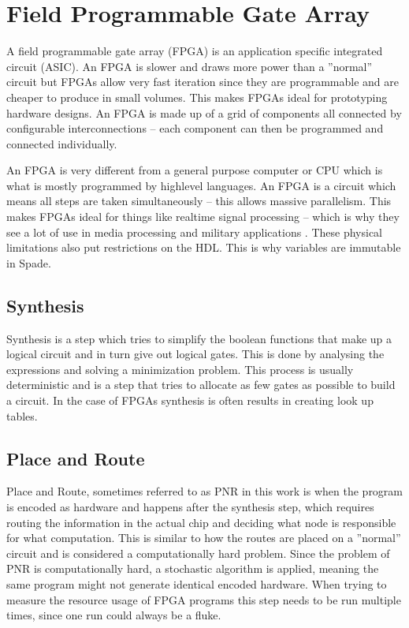 \section{Field Programmable Gate Array}
A field programmable gate array (FPGA) is an application specific integrated circuit (ASIC). An FPGA is slower and draws more power than a ''normal'' circuit but FPGAs allow very fast iteration since they are programmable and are cheaper to produce in small volumes. This makes FPGAs ideal for prototyping hardware designs. An FPGA is made up of a grid of components all connected by configurable interconnections -- each component can then be programmed and connected individually. \cite{src:FPGA}

An FPGA is very different from a general purpose computer or CPU which is what is mostly programmed by highlevel languages. An FPGA is a circuit which means all steps are taken simultaneously -- this allows massive parallelism. This makes FPGAs ideal for things like realtime signal processing -- which is why they see a lot of use in media processing and military applications \cite{src:FPGAApplications}. These physical limitations also put restrictions on the HDL. This is why variables are immutable in Spade.

\subsection{Synthesis}
Synthesis is a step which tries to simplify the boolean functions that make up a logical circuit and in turn give out logical gates. This is done by analysing the expressions and solving a minimization problem. This process is usually deterministic and is a step that tries to allocate as few gates as possible to build a circuit. In the case of FPGAs synthesis is often results in creating look up tables.

\subsection{Place and Route}
Place and Route, sometimes referred to as PNR in this work is when the program is encoded as hardware and happens after the synthesis step, which requires routing the information in the actual chip and deciding what node is responsible for what computation. This is similar to how the routes are placed on a ''normal'' circuit and is considered a computationally hard problem. Since the problem of PNR is computationally hard, a stochastic algorithm is applied, meaning the same program might not generate identical encoded hardware. When trying to measure the resource usage of FPGA programs this step needs to be run multiple times, since one run could always be a fluke.
